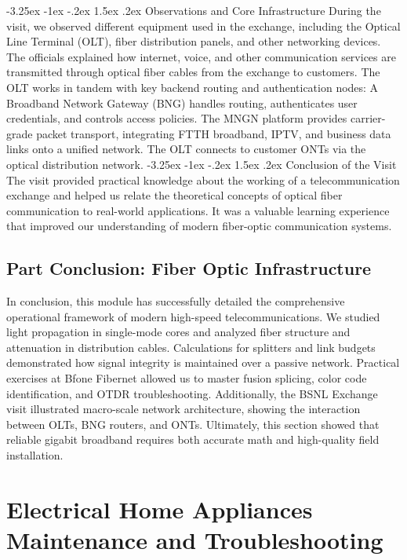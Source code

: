 \documentclass[11pt,a4paper]{report}
\makeatletter
\renewcommand{\section}{\@startsection{section}{1}{\z@}%
  {-3.25ex \@plus -1ex \@minus -.2ex}%
  {1.5ex \@plus.2ex}%
  {\normalfont\Large\bfseries\color{primaryColor}}}
\makeatother
\begin{document}
\section{Observations and Core Infrastructure}
During the visit, we observed different equipment used in the exchange, including the Optical Line Terminal (OLT), fiber distribution panels, and other networking devices. The officials explained how internet, voice, and other communication services are transmitted through optical fiber cables from the exchange to customers. The OLT works in tandem with key backend routing and authentication nodes: A Broadband Network Gateway (BNG) handles routing, authenticates user credentials, and controls access policies. The MNGN platform provides carrier-grade packet transport, integrating FTTH broadband, IPTV, and business data links onto a unified network. The OLT connects to customer ONTs via the optical distribution network.
\section{Conclusion of the Visit}
The visit provided practical knowledge about the working of a telecommunication exchange and helped us relate the theoretical concepts of optical fiber communication to real-world applications. It was a valuable learning experience that improved our understanding of modern fiber-optic communication systems.
\chapter*{Part Conclusion: Fiber Optic Infrastructure}
In conclusion, this module has successfully detailed the comprehensive operational framework of modern high-speed telecommunications. We studied light propagation in single-mode cores and analyzed fiber structure and attenuation in distribution cables. Calculations for splitters and link budgets demonstrated how signal integrity is maintained over a passive network. Practical exercises at Bfone Fibernet allowed us to master fusion splicing, color code identification, and OTDR troubleshooting. Additionally, the BSNL Exchange visit illustrated macro-scale network architecture, showing the interaction between OLTs, BNG routers, and ONTs. Ultimately, this section showed that reliable gigabit broadband requires both accurate math and high-quality field installation.
\part{Electrical Home Appliances Maintenance and Troubleshooting}
\end{document}
